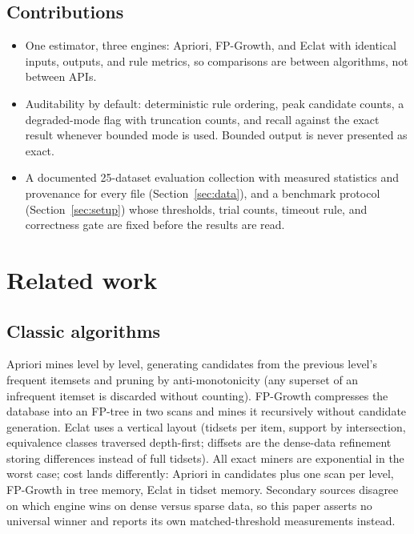 \documentclass[journal,a4paper]{IEEEtran}
\begin{document}
\subsection{Contributions}
\begin{itemize}
  \item One estimator, three engines: Apriori, FP-Growth, and Eclat
  with identical inputs, outputs, and rule metrics, so comparisons are
  between algorithms, not between APIs.
  \item Auditability by default: deterministic rule ordering, peak
  candidate counts, a degraded-mode flag with truncation counts, and
  recall against the exact result whenever bounded mode is used.
  Bounded output is never presented as exact.
  \item A documented 25-dataset evaluation collection with measured
  statistics and provenance for every file (Section~\ref{sec:data}),
  and a benchmark protocol (Section~\ref{sec:setup}) whose thresholds,
  trial counts, timeout rule, and correctness gate are fixed before the
  results are read.
\end{itemize}

\section{Related work}

\subsection{Classic algorithms}
Apriori \cite{agrawal1994} mines level by level, generating candidates
from the previous level's frequent itemsets and pruning by
anti-monotonicity (any superset of an infrequent itemset is discarded
without counting). FP-Growth \cite{han2000,han2004} compresses the database into
an FP-tree in two scans and mines it recursively without candidate
generation. Eclat \cite{zaki2000} uses a vertical layout (tidsets per item,
support by intersection, equivalence classes traversed depth-first;
diffsets are the dense-data refinement storing differences instead of
full tidsets). All exact miners are exponential in the worst case; cost
lands differently: Apriori in candidates plus one scan per level,
FP-Growth in tree memory, Eclat in tidset memory. Secondary sources disagree on which engine
wins on dense versus sparse data, so this paper asserts no universal
winner and reports its own matched-threshold measurements instead.
\end{document}
